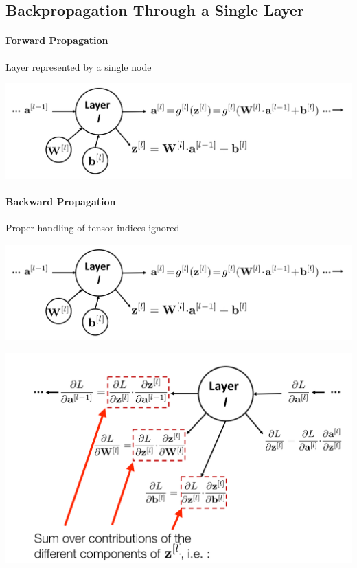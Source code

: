 \documentclass[11pt]{article}
\begin{document}
\subsection{Backpropagation Through a Single Layer}
\paragraph{Forward Propagation} Layer represented by a single node
\begin{center}
	\includegraphics[width=0.8\linewidth]{img/forward_propagation_single_layer}
\end{center}

\paragraph{Backward Propagation} Proper handling of tensor indices ignored
\begin{center}
	\includegraphics[width=0.8\linewidth]{img/forward_propagation_single_layer}
\end{center}

\begin{center}
	\includegraphics[width=0.8\linewidth]{img/backward_propagation_single_layer2}
\end{center}
\end{document}
